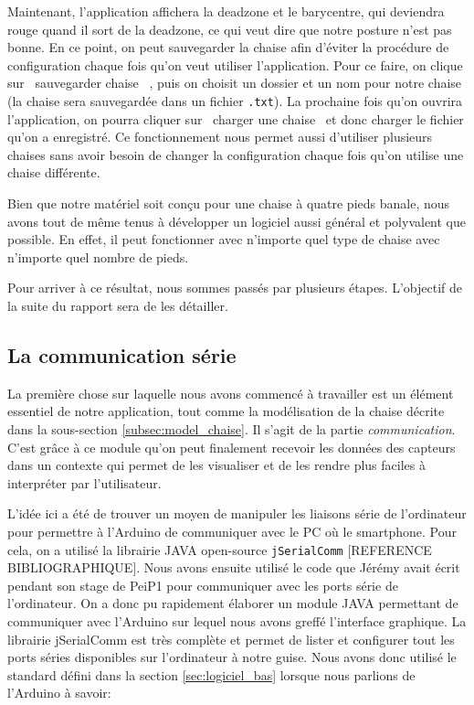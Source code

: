 \documentclass{polytech/polytech}
\begin{document}
Maintenant, l'application affichera la deadzone et le barycentre, qui deviendra rouge quand il sort de la deadzone, ce qui veut dire que notre posture n'est pas bonne.
 En ce point, on peut sauvegarder la chaise afin d'éviter la procédure de configuration chaque fois qu'on veut utiliser l'application. 
Pour ce faire, on clique sur \guillemotleft\ sauvegarder chaise \guillemotright\ , puis on choisit un dossier et un nom pour notre chaise (la chaise sera sauvegardée dans un fichier \texttt{.txt}). 
La prochaine fois qu'on ouvrira l'application, on pourra cliquer sur \guillemotleft\ charger une chaise \guillemotright\  et donc charger le fichier qu'on a enregistré.
 Ce fonctionnement nous permet aussi d'utiliser plusieurs chaises sans avoir besoin de changer la configuration chaque fois qu'on utilise une chaise différente.

Bien que notre matériel soit conçu pour une chaise à quatre pieds banale, nous avons tout de même tenus à développer un logiciel aussi général et polyvalent que possible.
En effet, il peut fonctionner avec n'importe quel type de chaise avec n'importe quel nombre de pieds.

Pour arriver à ce résultat, nous sommes passés par plusieurs étapes. L'objectif de la suite du rapport sera de les détailler.

\subsection{La communication série}
\label{subsec:comm_serie}
La première chose sur laquelle nous avons commencé à travailler est un élément essentiel de notre application, tout comme la modélisation de la chaise décrite dans la sous-section \ref{subsec:model_chaise}. Il s'agit de la partie \textit{communication}. C'est grâce à ce module qu'on peut finalement recevoir les données des capteurs dans un contexte qui permet de les visualiser et de les rendre plus faciles à interpréter par l'utilisateur.

L'idée ici a été de trouver un moyen de manipuler les liaisons série de l'ordinateur pour permettre à l'Arduino de communiquer avec le PC où le smartphone.
Pour cela, on a utilisé la librairie JAVA open-source \texttt{jSerialComm} [REFERENCE BIBLIOGRAPHIQUE]. Nous avons ensuite utilisé le code que Jérémy avait écrit pendant son stage de PeiP1 pour communiquer avec les ports série de l'ordinateur. On a donc pu rapidement élaborer un module JAVA permettant de communiquer avec l'Arduino sur lequel nous avons greffé l'interface graphique. La librairie jSerialComm est très complète et permet de lister et configurer tout les ports séries disponibles sur l'ordinateur à notre guise. Nous avons donc utilisé le standard défini dans la section \ref{sec:logiciel_bas} lorsque nous parlions de l'Arduino à savoir:
\end{document}
